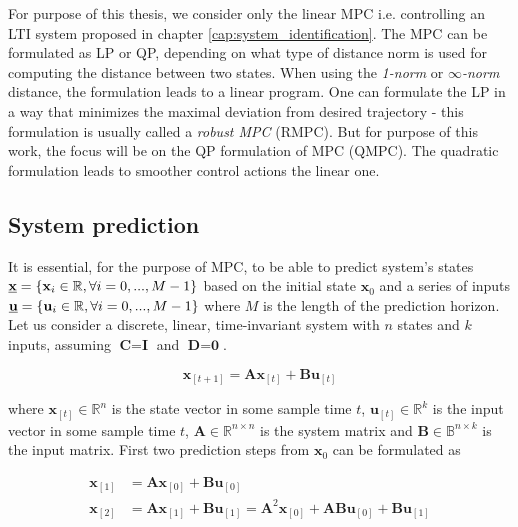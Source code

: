 For purpose of this thesis, we consider only the linear MPC i.e. controlling an LTI system proposed in chapter \ref{cap:system_identification}. The MPC can be formulated as LP or QP, depending on what type of distance norm is used for computing the distance between two states. When using the \mbox{\emph{1-norm}} or \mbox{\emph{$\infty$-norm}} distance, the formulation leads to a linear program. One can formulate the LP in a way that minimizes the maximal deviation from desired trajectory - this formulation is usually called a \emph{robust MPC} (RMPC). But for purpose of this work, the focus will be on the QP formulation of MPC (QMPC). The quadratic formulation leads to smoother control actions the linear one.

\subsection{System prediction}

It is essential, for the purpose of MPC, to be able to predict system's states $\textbf{\underline{x}} = \left\lbrace \textbf{x}_i \in \mathbb{R}, \forall i = 0, ..., M-1 \right\rbrace$ based on the initial state $\textbf{x}_0$ and a series of inputs $\textbf{\underline{u}} = \left\lbrace \textbf{u}_i \in \mathbb{R}, \forall i = 0, ..., M-1 \right\rbrace$ where $M$ is the length of the prediction horizon. Let us consider a discrete, linear, time-invariant system with $n$ states and $k$ inputs, assuming $\textbf{C} = \textbf{I}$ and $\textbf{D} = \textbf{0}$.

\begin{equation}
\textbf{x}_{[t+1]} = \textbf{A}\textbf{x}_{[t]} + \textbf{B}\textbf{u}_{[t]}
\label{eq:mpc_lti_system}
\end{equation}

where $\textbf{x}_{[t]} \in \mathbb{R}^{n}$ is the state vector in some sample time $t$, $\textbf{u}_{[t]} \in \mathbb{R}^k$ is the input vector in some sample time $t$, $\textbf{A} \in \mathbb{R}^{n\times n}$ is the system matrix and $\textbf{B} \in \mathbb{B}^{n\times k}$ is the input matrix. First two prediction steps from $\textbf{x}_0$ can be formulated as

\begin{equation}
\begin{split}
\textbf{x}_{[1]} &= \textbf{A}\textbf{x}_{[0]} + \textbf{B}\textbf{u}_{[0]} \\
\textbf{x}_{[2]} &= \textbf{A}\textbf{x}_{[1]} + \textbf{B}\textbf{u}_{[1]} = \textbf{A}^2\textbf{x}_{[0]} + \textbf{A}\textbf{B}\textbf{u}_{[0]} + \textbf{B}\textbf{u}_{[1]}
\end{split}
\end{equation}

